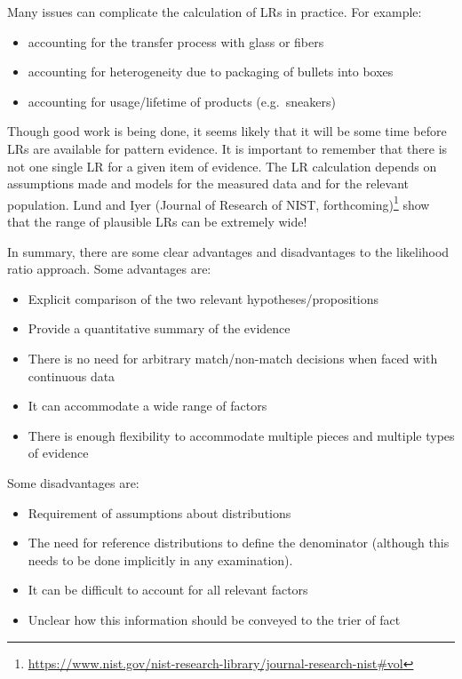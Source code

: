 \documentclass[]{book}
\providecommand{\tightlist}{%
  \setlength{\itemsep}{0pt}\setlength{\parskip}{0pt}}
\let\rmarkdownfootnote\footnote%
\def\footnote{\protect\rmarkdownfootnote}
\theoremstyle{definition}
\theoremstyle{definition}
\theoremstyle{remark}
\begin{document}
Many issues can complicate the calculation of LRs in practice. For
example:

\begin{itemize}
\tightlist
\item
  accounting for the transfer process with glass or fibers
\item
  accounting for heterogeneity due to packaging of bullets into boxes
\item
  accounting for usage/lifetime of products (e.g.~sneakers)
\end{itemize}

Though good work is being done, it seems likely that it will be some
time before LRs are available for pattern evidence. It is important to
remember that there is not one single LR for a given item of evidence.
The LR calculation depends on assumptions made and models for the
measured data and for the relevant population. Lund and Iyer (Journal of
Research of NIST, forthcoming)\footnote{\url{https://www.nist.gov/nist-research-library/journal-research-nist\#vol}}
show that the range of plausible LRs can be extremely wide!

In summary, there are some clear advantages and disadvantages to the
likelihood ratio approach. Some advantages are:

\begin{itemize}
\tightlist
\item
  Explicit comparison of the two relevant hypotheses/propositions
\item
  Provide a quantitative summary of the evidence
\item
  There is no need for arbitrary match/non-match decisions when faced
  with continuous data
\item
  It can accommodate a wide range of factors
\item
  There is enough flexibility to accommodate multiple pieces and
  multiple types of evidence
\end{itemize}

Some disadvantages are:

\begin{itemize}
\tightlist
\item
  Requirement of assumptions about distributions
\item
  The need for reference distributions to define the denominator
  (although this needs to be done implicitly in any examination).
\item
  It can be difficult to account for all relevant factors
\item
  Unclear how this information should be conveyed to the trier of fact
\end{itemize}
\end{document}
